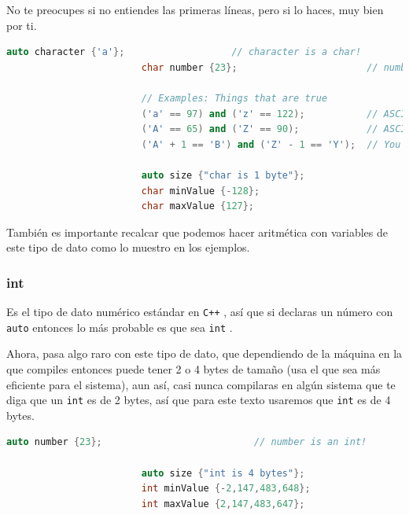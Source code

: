 \documentclass[12pt, fleqn]{report}                             %
\theoremstyle{break}                                            %
\newcommand{\textCode}[1]  { \texttt{#1} }                      %
\newcommand{\Cpp}{\ignorespaces\textCode{C++}}                  %
\begin{document}
                    No te preocupes si no entiendes las primeras líneas, pero si lo haces, muy bien por ti.
                    \begin{lstlisting}[language=C++, gobble=24]
                        auto character {'a'};                   // character is a char!
                        char number {23};                       // number is a char!

                        // Examples: Things that are true
                        ('a' == 97) and ('z' == 122);           // ASCII is just numbers
                        ('A' == 65) and ('Z' == 90);            // ASCII is just numbers
                        ('A' + 1 == 'B') and ('Z' - 1 == 'Y');  // You can do arithmetic

                        auto size {"char is 1 byte"};
                        char minValue {-128};
                        char maxValue {127};
                    \end{lstlisting}

                    También es importante recalcar que podemos hacer aritmética con variables de este tipo
                    de dato como lo muestro en los ejemplos.


                \clearpage
                \subsubsection{int}

                    Es el tipo de dato numérico estándar en \Cpp, así que si declaras un número
                    con \textCode{auto} entonces lo más probable es que sea \textCode{int}.

                    Ahora, pasa algo raro con este tipo de dato, que dependiendo de la máquina
                    en la que compiles entonces puede tener 2 o 4 bytes de tamaño (usa el que
                    sea más eficiente para el sistema), aun así, casi nunca compilaras en 
                    algún sistema que te diga que un \textCode{int} es de 2 bytes, así que para
                    este texto usaremos que \textCode{int} es de 4 bytes.
                    \begin{lstlisting}[language=C++, gobble=24]
                        auto number {23};                           // number is an int!

                        auto size {"int is 4 bytes"};
                        int minValue {-2,147,483,648};
                        int maxValue {2,147,483,647};
                    \end{lstlisting}
\end{document}
